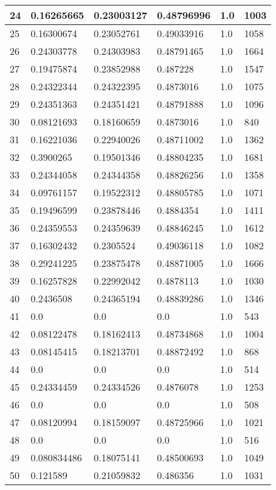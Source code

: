 \begin{longtable}{|l|l|l|l|l|l|}
24 & 0.16265665 & 0.23003127 & 0.48796996 & 1.0 & 1003 \\ \hline 
25 & 0.16300674 & 0.23052761 & 0.49033916 & 1.0 & 1058 \\ \hline 
26 & 0.24303778 & 0.24303983 & 0.48791465 & 1.0 & 1664 \\ \hline 
27 & 0.19475874 & 0.23852988 & 0.487228 & 1.0 & 1547 \\ \hline 
28 & 0.24322344 & 0.24322395 & 0.4873016 & 1.0 & 1075 \\ \hline 
29 & 0.24351363 & 0.24351421 & 0.48791888 & 1.0 & 1096 \\ \hline 
30 & 0.08121693 & 0.18160659 & 0.4873016 & 1.0 & 840 \\ \hline 
31 & 0.16221036 & 0.22940026 & 0.48711002 & 1.0 & 1362 \\ \hline 
32 & 0.3900265 & 0.19501346 & 0.48804235 & 1.0 & 1681 \\ \hline 
33 & 0.24344058 & 0.24344358 & 0.48826256 & 1.0 & 1358 \\ \hline 
34 & 0.09761157 & 0.19522312 & 0.48805785 & 1.0 & 1071 \\ \hline 
35 & 0.19496599 & 0.23878446 & 0.4884354 & 1.0 & 1411 \\ \hline 
36 & 0.24359553 & 0.24359639 & 0.48846245 & 1.0 & 1612 \\ \hline 
37 & 0.16302432 & 0.2305524 & 0.49036118 & 1.0 & 1082 \\ \hline 
38 & 0.29241225 & 0.23875478 & 0.48871005 & 1.0 & 1666 \\ \hline 
39 & 0.16257828 & 0.22992042 & 0.4878113 & 1.0 & 1030 \\ \hline 
40 & 0.2436508 & 0.24365194 & 0.48839286 & 1.0 & 1346 \\ \hline 
41 & 0.0 & 0.0 & 0.0 & 1.0 & 543 \\ \hline 
42 & 0.08122478 & 0.18162413 & 0.48734868 & 1.0 & 1004 \\ \hline 
43 & 0.08145415 & 0.18213701 & 0.48872492 & 1.0 & 868 \\ \hline 
44 & 0.0 & 0.0 & 0.0 & 1.0 & 514 \\ \hline 
45 & 0.24334459 & 0.24334526 & 0.4876078 & 1.0 & 1253 \\ \hline 
46 & 0.0 & 0.0 & 0.0 & 1.0 & 508 \\ \hline 
47 & 0.08120994 & 0.18159097 & 0.48725966 & 1.0 & 1021 \\ \hline 
48 & 0.0 & 0.0 & 0.0 & 1.0 & 516 \\ \hline 
49 & 0.080834486 & 0.18075141 & 0.48500693 & 1.0 & 1049 \\ \hline 
50 & 0.121589 & 0.21059832 & 0.486356 & 1.0 & 1031 \\ \hline 
\end{longtable}